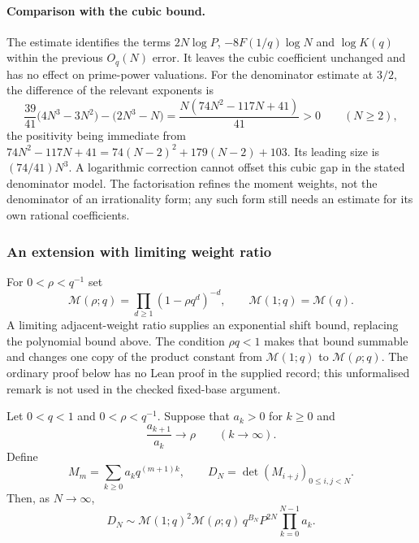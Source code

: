 \paragraph{Comparison with the cubic bound.}
The estimate identifies the terms $2N\log P$, $-8F(1/q)\log N$
and $\log K(q)$ within the previous $O_q(N)$ error. It leaves the
cubic coefficient unchanged and has no effect on prime-power
valuations. For the denominator estimate at $3/2$, the difference
of the relevant exponents is
\[
 \frac{39}{41}\bigl(4N^3-3N^2\bigr)-\bigl(2N^3-N\bigr)
 =\frac{N(74N^2-117N+41)}{41}>0\qquad(N\ge2),
\]
the positivity being immediate from
$74N^2-117N+41=74(N-2)^2+179(N-2)+103$. Its leading size is $(74/41)N^3$. A logarithmic correction cannot
offset this cubic gap in the stated denominator model. The
factorisation refines the moment weights, not the denominator of
an irrationality form; any such form still needs an estimate for
its own rational coefficients.


\subsubsection*{An extension with limiting weight ratio}

For $0<\rho<q^{-1}$ set
\[
 \mathcal M(\rho;q)=\prod_{d\ge1}(1-\rho q^d)^{-d},
 \qquad \mathcal M(1;q)=\mathcal M(q).
\]
A limiting adjacent-weight ratio supplies an exponential shift
bound, replacing the polynomial bound above. The condition
$\rho q<1$ makes that bound summable and changes one copy of
the product constant from $\mathcal M(1;q)$ to $\mathcal M(\rho;q)$.
The ordinary proof below has no Lean proof in the supplied record;
this unformalised remark is not used in the checked fixed-base argument.

\begin{remark}\label{long1049:thm:geometric-ratio}
Let $0<q<1$ and $0<\rho<q^{-1}$. Suppose that $a_k>0$ for $k\ge0$ and
\[
 \frac{a_{k+1}}{a_k}\longrightarrow\rho\qquad(k\to\infty).
\]
Define
\[
 M_m=\sum_{k\ge0}a_kq^{(m+1)k},\qquad
 D_N=\det(M_{i+j})_{0\le i,j<N}.
\]
Then, as $N\to\infty$,
\begin{equation}\label{long1049:eq:ratio-limit}
 D_N\sim \mathcal M(1;q)^2\mathcal M(\rho;q)\,
 q^{B_N}P^{2N}\prod_{k=0}^{N-1}a_k.
\end{equation}
\end{remark}

